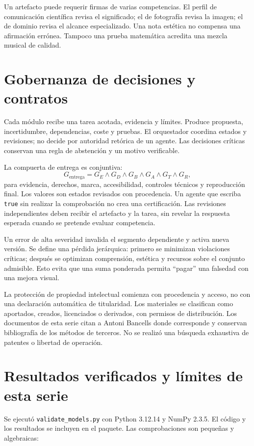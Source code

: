 Un artefacto puede requerir firmas de varias competencias. El perfil de comunicación científica revisa el significado; el de fotografía revisa la imagen; el de dominio revisa el alcance especializado. Una nota estética no compensa una afirmación errónea. Tampoco una prueba matemática acredita una mezcla musical de calidad.

\section{Gobernanza de decisiones y contratos}
Cada módulo recibe una tarea acotada, evidencia y límites. Produce propuesta, incertidumbre, dependencias, coste y pruebas. El orquestador coordina estados y revisiones; no decide por autoridad retórica de un agente. Las decisiones críticas conservan una regla de abstención y un motivo verificable.

La compuerta de entrega es conjuntiva:
\begin{equation}
 G_{\mathrm{entrega}}=G_E\land G_D\land G_B\land G_A\land G_T\land G_R,
\end{equation}
para evidencia, derechos, marca, accesibilidad, controles técnicos y reproducción final. Los valores son estados revisados con procedencia. Un agente que escriba \texttt{true} sin realizar la comprobación no crea una certificación. Las revisiones independientes deben recibir el artefacto y la tarea, sin revelar la respuesta esperada cuando se pretende evaluar competencia.

Un error de alta severidad invalida el segmento dependiente y activa nueva versión. Se define una pérdida jerárquica: primero se minimizan violaciones críticas; después se optimizan comprensión, estética y recursos sobre el conjunto admisible. Esto evita que una suma ponderada permita ``pagar'' una falsedad con una mejora visual.

La protección de propiedad intelectual comienza con procedencia y acceso, no con una declaración automática de titularidad. Los materiales se clasifican como aportados, creados, licenciados o derivados, con permisos de distribución. Los documentos de esta serie citan a Antoni Bancells donde corresponde y conservan bibliografía de los métodos de terceros. No se realizó una búsqueda exhaustiva de patentes o libertad de operación.

\section{Resultados verificados y límites de esta serie}
Se ejecutó \texttt{validate\_models.py} con Python 3.12.14 y NumPy 2.3.5. El código y los resultados se incluyen en el paquete. Las comprobaciones son pequeñas y algebraicas:


